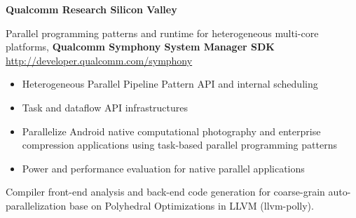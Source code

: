 
\textbf{Qualcomm Research Silicon Valley} \\

\vspace{2mm}
Parallel programming patterns and runtime for heterogeneous multi-core platforms, 
 \textbf{Qualcomm Symphony System Manager SDK} \href{http://developer.qualcomm.com/symphony}{http://developer.qualcomm.com/symphony}

\begin{itemize}
\item Heterogeneous Parallel Pipeline Pattern API and internal scheduling
\item Task and dataflow API infrastructures
\item Parallelize Android native computational photography and enterprise compression applications using task-based parallel programming patterns
\item Power and performance evaluation for native parallel applications
\end{itemize}  
  
\vspace{2mm}
Compiler front-end analysis and back-end code generation for coarse-grain auto-parallelization base on Polyhedral Optimizations in LLVM (llvm-polly). 
\vspace{4mm}


